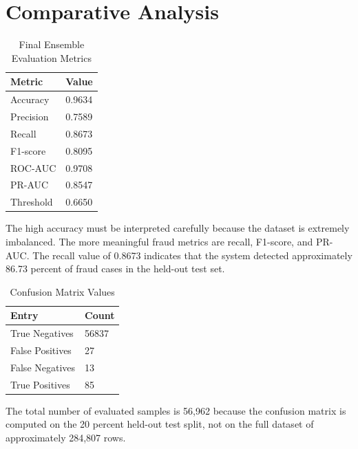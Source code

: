 \section{Comparative Analysis}
\begin{table}[H]
\centering
\caption{Final Ensemble Evaluation Metrics}
\begin{tabular}{|p{5cm}|p{4cm}|}
\hline
\textbf{Metric} & \textbf{Value} \\
\hline
Accuracy & 0.9634  \\
\hline
Precision & 0.7589 \\
\hline
Recall & 0.8673 \\
\hline
F1-score & 0.8095 \\
\hline
ROC-AUC & 0.9708 \\
\hline
PR-AUC & 0.8547 \\
\hline
Threshold & 0.6650 \\
\hline
\end{tabular}
\end{table}

The high accuracy must be interpreted carefully because the dataset is extremely imbalanced. The more meaningful fraud metrics are recall, F1-score, and PR-AUC. The recall value of 0.8673 indicates that the system detected approximately 86.73 percent of fraud cases in the held-out test set.

\begin{table}[H]
\centering
\caption{Confusion Matrix Values}
\begin{tabular}{|p{4cm}|p{4cm}|}
\hline
\textbf{Entry} & \textbf{Count} \\
\hline
True Negatives & 56837 \\
\hline
False Positives & 27 \\
\hline
False Negatives & 13 \\
\hline
True Positives & 85 \\
\hline
\end{tabular}
\end{table}

The total number of evaluated samples is 56,962 because the confusion matrix is computed on the 20 percent held-out test split, not on the full dataset of approximately 284,807 rows.

